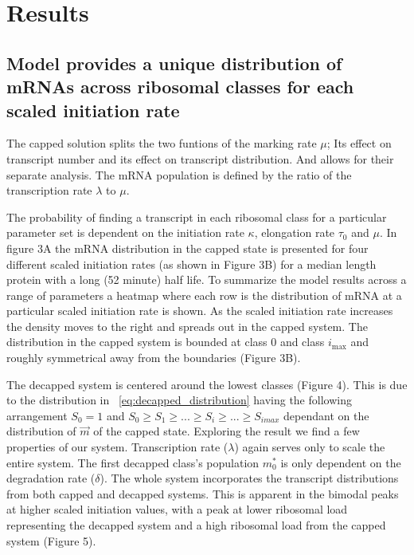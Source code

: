 \documentclass[review]{elsarticle}
\newcommand{\imax}{\ensuremath{i_{\max}}\xspace}
\begin{document}


\section{Results}

\subsection{Model provides a unique distribution of mRNAs across ribosomal classes for each scaled initiation rate}

The capped solution splits the two funtions of the marking rate $\mu$; Its effect on transcript number and its effect on transcript distribution. And allows for their separate analysis. The mRNA population is defined by the ratio of the transcription rate $\lambda$ to $\mu$.  

The probability of finding a transcript in each ribosomal class for a particular parameter set is dependent on the initiation rate $\kappa$, elongation rate $\tau_0$ and $\mu$. In figure 3A the mRNA distribution in the capped state is presented for four different scaled initiation rates (as shown in Figure 3B) for a median length protein with a long (52 minute) half life. To summarize the model results across a range of parameters a heatmap where each row is the distribution of mRNA at a particular scaled initiation rate is shown. As the scaled initiation rate increases the density moves to the right and spreads out in the capped system.  The distribution in the capped system is bounded at class 0 and class \imax and roughly symmetrical away from the boundaries (Figure 3B). 

The decapped system is centered around the lowest classes (Figure 4). This is due to the distribution in ~\ref{eq:decapped_distribution} having the following arrangement $S_{0}=1$ and $ S_{0} \ge S_{1} \ge ... \ge S_{i} \ge ... \ge S_{imax}$ dependant on the distribution of $\vec{m}$ of the capped state. Exploring the result we find a few properties of our system. Transcription rate ($\lambda$) again serves only to scale the entire system. The first decapped class's population $m_{0}^{*}$ is only dependent on the degradation rate ($\delta$). The whole system incorporates the transcript distributions from both capped and decapped systems. This is apparent in the bimodal peaks at higher scaled initiation values, with a peak at lower ribosomal load representing the decapped system and a high ribosomal load from the capped system (Figure 5).
\end{document}
